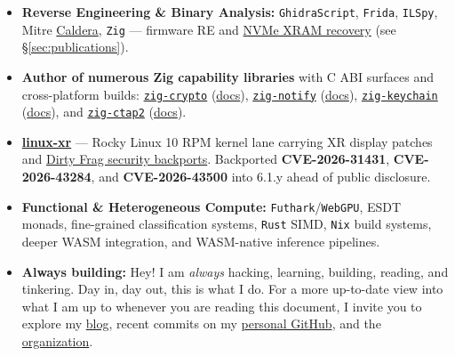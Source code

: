 \documentclass[11pt,letterpaper]{article}
\newcommand{\tech}[1]{\texttt{\small\color{secondary}#1}}
\newcommand{\cvlink}[2]{\href{#1}{\color{linkcolor}#2}}
\begin{document}
\begin{itemize}
    \item \textbf{Reverse Engineering \& Binary Analysis:} \tech{GhidraScript}, \tech{Frida}, \tech{ILSpy}, Mitre \cvlink{https://github.com/Jesssullivan/caldera}{Caldera}, \tech{Zig} --- firmware RE and \cvlink{https://github.com/Jesssullivan/hiberpower-ntfs/pull/1}{NVMe XRAM recovery} (see \S\ref{sec:publications}).
    \item \textbf{Author of numerous Zig capability libraries} with C ABI surfaces and cross-platform builds: \cvlink{https://github.com/Jesssullivan/zig-crypto}{\tech{zig-crypto}} (\cvlink{https://transscendsurvival.org/zig-crypto/}{docs}), \cvlink{https://github.com/Jesssullivan/zig-notify}{\tech{zig-notify}} (\cvlink{https://transscendsurvival.org/zig-notify/}{docs}), \cvlink{https://github.com/Jesssullivan/zig-keychain}{\tech{zig-keychain}} (\cvlink{https://transscendsurvival.org/zig-keychain/}{docs}), and \cvlink{https://github.com/Jesssullivan/zig-ctap2}{\tech{zig-ctap2}} (\cvlink{https://transscendsurvival.org/zig-ctap2/}{docs}).
    \item \cvlink{https://github.com/tinyland-inc/linux-xr}{\textbf{linux-xr}} --- Rocky Linux 10 RPM kernel lane carrying XR display patches and \cvlink{https://github.com/tinyland-inc/linux-xr/pull/66}{Dirty Frag security backports}. Backported \textbf{CVE-2026-31431}, \textbf{CVE-2026-43284}, and \textbf{CVE-2026-43500} into 6.1.y ahead of public disclosure.
    \item \textbf{Functional \& Heterogeneous Compute:} \tech{Futhark}/\tech{WebGPU}, ESDT monads, fine-grained classification systems, \tech{Rust} SIMD, \tech{Nix} build systems, deeper WASM integration, and WASM-native inference pipelines.
    \item \textbf{Always building:} Hey! I am \textit{always} hacking, learning, building, reading, and tinkering. Day in, day out, this is what I do. For a more up-to-date view into what I am up to whenever you are reading this document, I invite you to explore my \cvlink{https://transscendsurvival.org}{blog}, recent commits on my \cvlink{https://github.com/Jesssullivan}{personal GitHub}, and the \cvlink{https://github.com/tinyland-inc}{organization}.
\end{itemize}

\newpage

\end{document}
